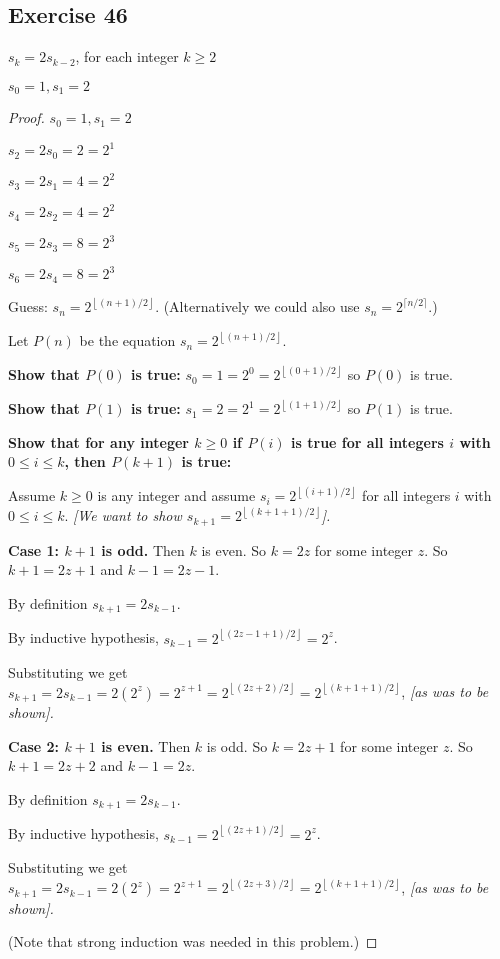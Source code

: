 \documentclass[14pt]{extarticle}
\newcommand{\dps}{\displaystyle}
\newcommand{\floor}[1]{{\left\lfloor#1\right\rfloor}}
\newcommand{\ceil}[1]{{\lceil#1\rceil}}
\begin{document}
\subsection{Exercise 46}
\(s_k = 2s_{k-2}\), for each integer \(k \geq 2\)

\(s_0 = 1, s_1 = 2\)

\begin{proof}
    \(s_0 = 1, s_1 = 2\)

    \(s_2 = 2s_0 = 2 = 2^1\)

    \(s_3 = 2s_1 = 4 = 2^2\)

    \(s_4 = 2s_2 = 4 = 2^2\)

    \(s_5 = 2s_3 = 8 = 2^3\)

    \(s_6 = 2s_4 = 8 = 2^3\)

    Guess: \(\dps s_n = 2^{\floor{(n+1)/2}}\). (Alternatively we could also use \(\dps s_n = 2^{\ceil{n/2}}\).)

    Let \(P(n)\) be the equation \(\dps s_n = 2^{\floor{(n+1)/2}}\).

        {\bf Show that $P(0)$ is true:} \(\dps s_0 = 1 = 2^0 = 2^{\floor{(0+1)/2}}\) so $P(0)$ is true.

        {\bf Show that $P(1)$ is true:} \(\dps s_1 = 2 = 2^1 = 2^{\floor{(1+1)/2}}\) so $P(1)$ is true.

        {\bf Show that for any integer \(k \geq 0\) if $P(i)$ is true for all integers $i$ with \(0 \leq i \leq k\), then
            $P(k+1)$ is true:}

    Assume \(k \geq 0\) is any integer and assume \(\dps s_i = 2^{\floor{(i+1)/2}}\) for all integers $i$ with
    \(0 \leq i \leq k\). {\it [We want to show \(\dps s_{k+1} = 2^{\floor{(k+1+1)/2}}\)].}

        {\bf Case 1: $k+1$ is odd.} Then $k$ is even. So $k = 2z$ for some integer $z$. So $k+1 = 2z+1$ and $k-1 = 2z-1$.

    By definition \(\dps s_{k+1} = 2s_{k-1}\).

    By inductive hypothesis, \(\dps s_{k-1} = 2^{\floor{(2z-1+1)/2}} = 2^{z}\).

    Substituting we get \(\dps s_{k+1} = 2s_{k-1} = 2(2^z) = 2^{z+1} = 2^{\floor{(2z+2)/2}} = 2^{\floor{(k+1+1)/2}}\),
    {\it [as was to be shown].}

        {\bf Case 2: $k+1$ is even.} Then $k$ is odd. So $k = 2z+1$ for some integer $z$. So $k+1 = 2z+2$ and $k-1 = 2z$.

    By definition \(s_{k+1} = 2s_{k-1}\).

    By inductive hypothesis, \(s_{k-1} = 2^{\floor{(2z+1)/2}} = 2^z\).

    Substituting we get \(\dps s_{k+1} = 2s_{k-1} = 2(2^z) = 2^{z+1} = 2^{\floor{(2z+3)/2}} = 2^{\floor{(k+1+1)/2}}\),
    {\it [as was to be shown].}

    (Note that strong induction was needed in this problem.)
\end{proof}
\end{document}
